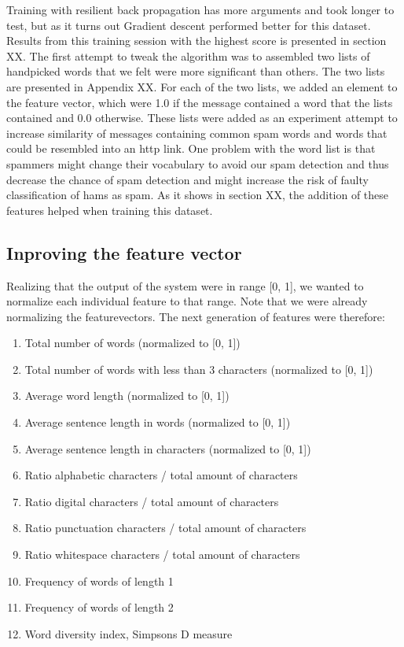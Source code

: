     Training with resilient back propagation has more arguments and took longer
    to test, but as it turns out Gradient descent performed better for this
    dataset. Results from this training session with the highest score is
    presented in section XX. 
    The first attempt to tweak the algorithm was to assembled two lists of
    handpicked words that we felt were more significant than others. The two
    lists are presented in Appendix XX.  For each of the two lists, we added an
    element to the feature vector, which were 1.0 if the message contained a
    word that the lists contained and 0.0 otherwise.   
    These lists were added as an experiment attempt to increase similarity of
    messages containing common spam words and words that could be resembled
    into an http link.
    One problem with the word list is that spammers might change their
    vocabulary to avoid our spam detection and thus decrease the chance of spam
    detection and might increase the risk of faulty classification of hams as
    spam.  As it shows in section XX, the addition of these features helped
    when training this dataset. 

  \subsection{Inproving the feature vector}
    Realizing that the output of the system were in range [0, 1], we wanted to
    normalize each individual feature to that range. Note that we were already
    normalizing the featurevectors. The next generation of features were
    therefore:
    \begin{enumerate}
      \item Total number of words (normalized to [0, 1])
      \item Total number of words with less than 3 characters 
        (normalized to [0, 1]) 
      \item Average word length 
        (normalized to [0, 1]) 
      \item Average sentence length in words
        (normalized to [0, 1]) 
      \item Average sentence length in characters
        (normalized to [0, 1]) 
      \item Ratio alphabetic characters / total amount of characters
      \item Ratio digital characters / total amount of characters
      \item Ratio punctuation characters / total amount of characters
      \item Ratio whitespace characters / total amount of characters
      \item Frequency of words of length 1
      \item Frequency of words of length 2
      \item Word diversity index, Simpsons D measure \cite{simpsons-measure}
    \end{enumerate}
  

